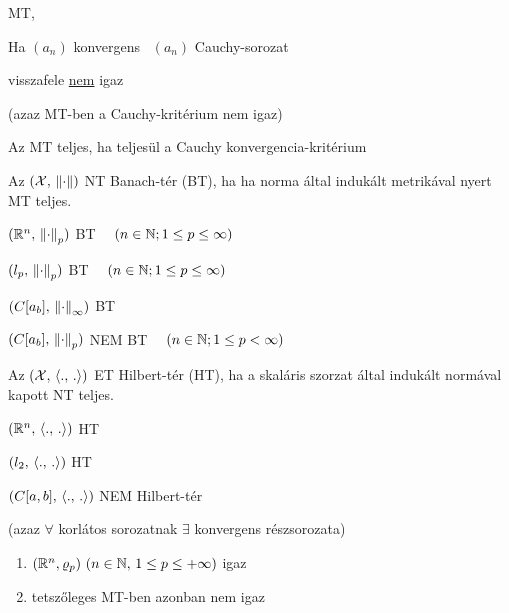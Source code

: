 \begin{te}
  \MT MT, \sorozat
  \begin{korlista}
  \item Ha $(a_n)$ konvergens \nn\ $(a_n)$ Cauchy-sorozat
  \item visszafele \underline{nem} igaz
  \end{korlista}
  (azaz  MT-ben a Cauchy-kritérium nem igaz)
\end{te}

\begin{de}[Teljesség]
  Az \MT MT teljes, ha teljesül  a Cauchy konvergencia-kritérium
\end{de}


\begin{de}
  Az $(\mathcal{X},\,\left\Vert \cdot\right\Vert)$ NT Banach-tér (BT), ha ha norma által indukált metrikával nyert MT teljes.
\end{de}

\begin{Pl}
\item $(\mathbb{R}^n,\,\left\Vert \cdot\right\Vert_p)$ BT $\quad(n\in\mathbb{N}; 1\leq p\leq \infty)$
\item $(l_p,\,\left\Vert \cdot\right\Vert_p)$ BT $\quad(n\in\mathbb{N}; 1\leq p\leq \infty)$
\item $(C[a_b],\,\left\Vert \cdot\right\Vert_\infty)$ BT 
\item $(C[a_b],\,\left\Vert \cdot\right\Vert_p)$ NEM BT $\quad(n\in\mathbb{N}; 1\leq p< \infty)$
\end{Pl}

\begin{de}
  Az $(\mathcal{X},\,\langle.,\,.\rangle)$ ET Hilbert-tér (HT), ha a skaláris szorzat által indukált normával kapott NT teljes.     
\end{de}


\begin{Pl}
\item $(\mathbb{R}^n,\,\langle.,\,.\rangle)$ HT
\item $(l_2,\,\langle.,\,.\rangle)$ HT
\item $(C[a,b],\,\langle.,\,.\rangle)$ NEM Hilbert-tér
\end{Pl}


\begin{te} (azaz
  $\forall$ korlátos sorozatnak $\exists$ konvergens részsorozata)
  \begin{enumerate}[\quad(a)]
  \item $(\mathbb{R}^n,\varrho_p)\ (n\in\mathbb{N},\,1\leq p \leq +\infty)$ igaz
  \item \MT tetszőleges MT-ben azonban nem igaz
  \end{enumerate}
\end{te}



